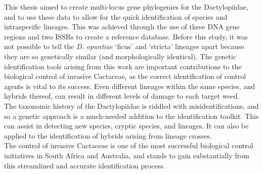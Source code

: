 This thesis aimed to create multi-locus gene phylogenies for the Dactylopiidae, and to use these data to allow for the quick identification of species and intraspecific lineages. This was achieved through the use of three DNA gene regions and two ISSRs to create a reference database. Before this study, it was not possible to tell the \textit{D. opuntiae} `ficus' and `stricta' lineages apart because they are so genetically similar (and morphologically identical).
The genetic identification tools arising from this work are important contributions to the biological control of invasive Cactaceae, as the correct identification of control agents is vital to its success. Even different lineages within the same species, and hybrids thereof, can result in different levels of damage to each target weed. \\
The taxonomic history of the Dactylopiidae is riddled with misidentifications, and so a genetic approach is a much-needed addition to the identification toolkit. This can assist in detecting new species, cryptic species, and lineages. It can also be applied to the identification of hybrids arising from lineage crosses. \\
The control of invasive Cactaceae is one of the most successful biological control initiatives in South Africa and Australia, and stands to gain substantially from this streamlined and accurate identification process.
